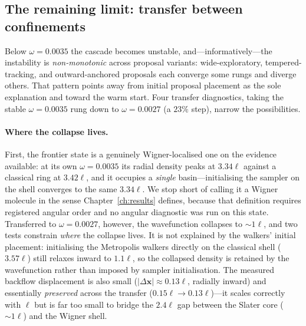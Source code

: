 \subsection{The remaining limit: transfer between confinements}
Below $\omega=0.0035$ the cascade becomes unstable, and---informatively---the instability
is \emph{non-monotonic} across proposal variants: wide-exploratory, tempered-tracking, and
outward-anchored proposals each converge some rungs and diverge others. That pattern points
away from initial proposal placement as the sole explanation and toward the warm start. Four
transfer diagnostics, taking the stable $\omega=0.0035$ rung down to $\omega=0.0027$ (a
$23\%$ step), narrow the possibilities.

\paragraph{Where the collapse lives.} First, the frontier state is a genuinely
Wigner-localised one on the evidence available: at
its own $\omega=0.0035$ its radial density peaks at $3.34\ell$ against a classical ring at
$3.42\ell$, and it occupies a \emph{single} basin---initialising the sampler on the shell
converges to the same $3.34\ell$. We stop short of calling it a Wigner molecule in the sense
Chapter~\ref{ch:results} defines, because that definition requires registered angular order
and no angular diagnostic was run on this state.
Transferred to $\omega=0.0027$, however, the wavefunction collapses to $\sim\!1\ell$, and two
tests constrain \emph{where} the collapse lives. It is not explained by the walkers' initial
placement: initialising the Metropolis
walkers directly on the classical shell ($3.57\ell$) still relaxes inward to $1.1\ell$, so the
collapsed density is retained by the wavefunction rather than imposed by sampler
initialisation. The measured backflow displacement is also small
($|\Delta\mathbf{x}|\approx0.13\ell$, radially inward) and
essentially \emph{preserved} across the transfer ($0.15\ell\!\to\!0.13\ell$)---it scales
correctly with $\ell$ but is far too small to bridge the $2.4\ell$ gap between the Slater core
($\sim\!1\ell$) and the Wigner shell.

